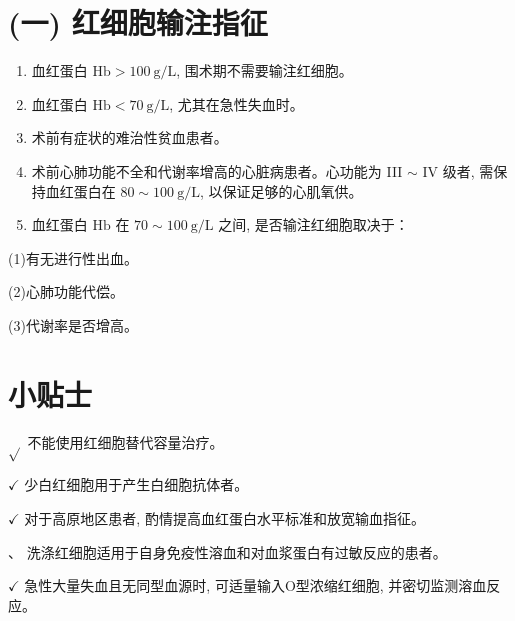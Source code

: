 \documentclass[10pt]{article}
\begin{document}
\section*{(一) 红细胞输注指征}
\begin{enumerate}
  \item 血红蛋白 $\mathrm{Hb}>100 \mathrm{~g} / \mathrm{L}$, 围术期不需要输注红细胞。

  \item 血红蛋白 $\mathrm{Hb}<70 \mathrm{~g} / \mathrm{L}$, 尤其在急性失血时。

  \item 术前有症状的难治性贫血患者。

  \item 术前心肺功能不全和代谢率增高的心脏病患者。心功能为 III $\sim$ IV 级者, 需保持血红蛋白在 $80 \sim 100 \mathrm{~g} / \mathrm{L}$, 以保证足够的心肌氧供。

  \item 血红蛋白 $\mathrm{Hb}$ 在 $70 \sim 100 \mathrm{~g} / \mathrm{L}$ 之间, 是否输注红细胞取决于：

\end{enumerate}

(1)有无进行性出血。

(2)心肺功能代偿。

(3)代谢率是否增高。

\section*{小贴士}
$\sqrt{ }$ 不能使用红细胞替代容量治疗。

$\checkmark$ 少白红细胞用于产生白细胞抗体者。

$\checkmark$ 对于高原地区患者, 酌情提高血红蛋白水平标准和放宽输血指征。

$、$ 洗涤红细胞适用于自身免疫性溶血和对血浆蛋白有过敏反应的患者。

$\checkmark$ 急性大量失血且无同型血源时, 可适量输入O型浓缩红细胞, 并密切监测溶血反应。
\end{document}
